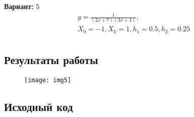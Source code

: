 {\bfseries Вариант:} 5
\begin{align*}
& y = \frac{1}{(2x + 7)(3x + 4)}, \\
& X_0 = -1, X_k = 1, h_1 = 0.5, h_2 = 0.25 \\
\end{align*}

\subsection{Результаты работы}
\begin{figure}[h!]
\centering
\texttt{[image: img5]}
\end{figure}
\pagebreak

\subsection{Исходный код}

\pagebreak